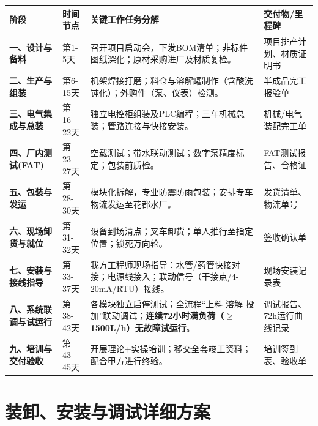 \documentclass[UTF8,a4paper,12pt,titlepage]{ctexart}
\begin{document}
    \begin{table}[htbp]
        \centering
        \renewcommand{\arraystretch}{1.6} %
        \begin{tabular}{>{\centering\arraybackslash}p{2.2cm} >{\centering\arraybackslash}p{2.2cm} >{\raggedright\arraybackslash}p{7.5cm} >{\raggedright\arraybackslash}p{3cm}}
            \toprule
            \textbf{阶段} & \textbf{时间节点} & \textbf{关键工作任务分解} & \textbf{交付物/里程碑} \\
            \midrule
            \textbf{一、设计与备料} & 第1-5天 & 召开项目启动会，下发BOM清单；非标件图纸深化；原材采购进厂及材质复检。 & 项目排产计划、材质证明书 \\
            \midrule \textbf{二、生产与组装} & 第6-15天 & 机架焊接打磨；料仓与溶解罐制作（含酸洗钝化）；外购件（泵、仪表）检测。 & 半成品完工报验单 \\
            \midrule
            \textbf{三、电气集成与总装} & 第16-22天 & 独立电控柜组装及PLC编程；三车机械总装；管路连接与快接安装。 & 机械/电气装配完工单 \\
            \midrule
            \textbf{四、厂内测试(FAT)} & 第23-27天 & 空载测试；带水联动测试；数字泵精度标定；包装前质检。 & FAT测试报告、合格证 \\
            \midrule
            \textbf{五、包装与发运} & 第28-30天 & 模块化拆解，专业防震防雨包装；安排专车物流发运至花都水厂。 & 发货清单、物流单号 \\
            \midrule
            \textbf{六、现场卸货与就位} & 第31-32天 & 设备到场清点；叉车卸货；单人推行至指定位置；锁死万向轮。 & 签收确认单 \\
            \midrule
            \textbf{七、安装与接线指导} & 第33-37天 & 我方工程师现场指导：水管/药管快接对接；电源线接入；联动信号（干接点/4-20mA/RTU）接线。 & 现场安装记录表 \\
            \midrule
            \textbf{八、系统联调与试运行} & 第38-42天 & 各模块独立启停测试；全流程“上料-溶解-投加”联动调试；\textbf{连续72小时满负荷（\(\ge\)1500L/h）无故障试运行}。 & 调试报告、72h运行曲线记录 \\
            \midrule
            \textbf{九、培训与交付验收} & 第43-45天 & 开展理论+实操培训；移交全套竣工资料；配合甲方进行终验。 & 培训签到表、验收单 \\
            \bottomrule
        \end{tabular}
    \end{table}

\section{装卸、安装与调试详细方案}
\end{document}

